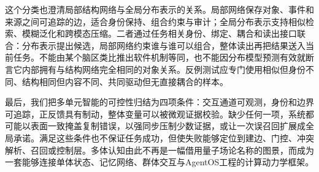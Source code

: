 这个分类也澄清局部结构网络与全局分布表示的关系。局部网络保存对象、事件和来源之间可追踪的边，适合身份保持、组合约束与审计；全局分布表示支持相似检索、模糊泛化和跨模态压缩。二者通过任务相关身份、绑定、耦合和读出接口联合：分布表示提出候选，局部网络约束谁与谁可以组合，整体读出再把结果送入当前任务。不能由某个脑区类比推出软件机制等同，也不能因分布模型预测有效就断言它内部拥有与结构网络完全相同的对象关系。反例测试应专门使用相似但身份不同、结构相同但内容不同、共同驱动但无直接耦合的样本。

最后，我们把多单元智能的可控性归结为四项条件：交互通道可观测，身份和边界可追踪，正反馈具有制动，整体变量可以被微观证据校验。缺少任何一项，系统都可能以表面一致掩盖复制错误，以强同步压制少数证据，或让一次误召回扩展成全局承诺。满足这些条件也不保证任务成功，但使失败能够定位到建边、门控、冲突解析、召回或控制层。多体认知由此不再是一幅借用量子场论名称的图景，而成为一套能够连接单体状态、记忆网络、群体交互与AgentOS工程的计算动力学框架。

